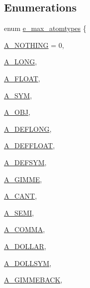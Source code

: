 \subsection*{Enumerations}
\begin{DoxyCompactItemize}
\item 
enum \hyperlink{group__atom_ga8aa6700e9f00b132eb376db6e39ade47}{e\_\-max\_\-atomtypes} \{ \par
\hyperlink{group__atom_gga8aa6700e9f00b132eb376db6e39ade47a858ddb5d5927eae3fd699a82c7e174b6}{A\_\-NOTHING} =  0, 
\par
\hyperlink{group__atom_gga8aa6700e9f00b132eb376db6e39ade47a002f28879581a6f66ea492b994b96f1e}{A\_\-LONG}, 
\par
\hyperlink{group__atom_gga8aa6700e9f00b132eb376db6e39ade47a0b3aa0ab8104573dfc9cb70b5b08031f}{A\_\-FLOAT}, 
\par
\hyperlink{group__atom_gga8aa6700e9f00b132eb376db6e39ade47a2d661c2a5d949566e2f1944c99bceeea}{A\_\-SYM}, 
\par
\hyperlink{group__atom_gga8aa6700e9f00b132eb376db6e39ade47a82cc76e0d53c8fc28df167c35d5bbd1a}{A\_\-OBJ}, 
\par
\hyperlink{group__atom_gga8aa6700e9f00b132eb376db6e39ade47a7bd979db3dcf86909e24a1d1452e2205}{A\_\-DEFLONG}, 
\par
\hyperlink{group__atom_gga8aa6700e9f00b132eb376db6e39ade47a42b644240dcbb90fe67282a4d0688776}{A\_\-DEFFLOAT}, 
\par
\hyperlink{group__atom_gga8aa6700e9f00b132eb376db6e39ade47aa010616276cb89bcd04bcba611e18d51}{A\_\-DEFSYM}, 
\par
\hyperlink{group__atom_gga8aa6700e9f00b132eb376db6e39ade47a81c1a8550f038db16a619167a70a79b6}{A\_\-GIMME}, 
\par
\hyperlink{group__atom_gga8aa6700e9f00b132eb376db6e39ade47af48193ec36e53b1507d81c49873c8d7a}{A\_\-CANT}, 
\par
\hyperlink{group__atom_gga8aa6700e9f00b132eb376db6e39ade47ac105be4ef726ee36c4330e16bb24706e}{A\_\-SEMI}, 
\par
\hyperlink{group__atom_gga8aa6700e9f00b132eb376db6e39ade47a07c3484085a3217107acec059d17b945}{A\_\-COMMA}, 
\par
\hyperlink{group__atom_gga8aa6700e9f00b132eb376db6e39ade47af0a5a9017f6b59e82a4859cd0560d36b}{A\_\-DOLLAR}, 
\par
\hyperlink{group__atom_gga8aa6700e9f00b132eb376db6e39ade47a9d47aadc47f728c2af7be2ec12a4a8c5}{A\_\-DOLLSYM}, 
\par
\hyperlink{group__atom_gga8aa6700e9f00b132eb376db6e39ade47ad150bf3de9c8dc2ddfa0ca0ca2382360}{A\_\-GIMMEBACK}, 

\end{DoxyCompactItemize}
